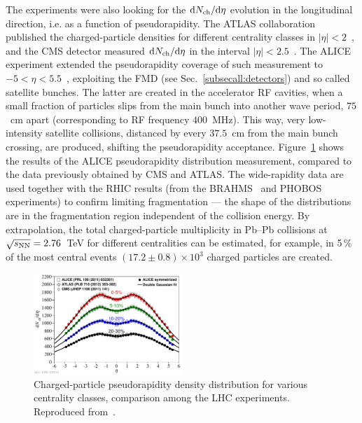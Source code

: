 The experiments were also looking for the ${\rm d}N_{\rm ch}/{\rm d}\eta$ evolution in the longitudinal direction, i.e. as a function of pseudorapidity. The ATLAS collaboration published the charged-particle densities for different centrality classes in $|\eta| < 2$~\cite{ATLAS:2011ag}, and the CMS detector measured ${\rm d}N_{\rm ch}/{\rm d}\eta$ in the interval $|\eta| < 2.5$~\cite{Chatrchyan:2011pb}. The ALICE experiment extended the pseudorapidity coverage of such measurement to $- 5 < \eta < 5.5$~\cite{Abbas:2013bpa}, exploiting the FMD (see Sec.~\ref{subsecall:detectors}) and so called satellite bunches. The latter are created in the accelerator RF cavities, when a small fraction of particles slips from the main bunch into another wave period, $75$~cm apart (corresponding to RF frequency $400$~MHz). This way, very low-intensity satellite collisions, distanced by every $37.5$~cm from the main bunch crossing, are produced, shifting the pseudorapidity acceptance. Figure~\ref{figks:MultEta} shows the results of the ALICE pseudorapidity distribution measurement, compared to the data previously obtained by CMS and ATLAS. The wide-rapidity data are used together with the RHIC results (from the BRAHMS~\cite{Bearden:2001qq} and PHOBOS~\cite{Alver:2010ck} experiments) to confirm limiting fragmentation --- the shape of the distributions are in the fragmentation region independent of the collision energy. By extrapolation, the total charged-particle multiplicity in Pb--Pb collisions at $\sqrt{s_{\rm NN}} = 2.76$~TeV for different centralities can be estimated, for example, in 5\,\% of the most central events $(17.2 \pm 0.8) \times 10^3$ charged particles are created.

\begin{figure}
\centering
\includegraphics[width=0.5\textwidth]{ksfigures/MultEtaCent.pdf}
\caption{Charged-particle pseudorapidity density distribution for various centrality classes, comparison among the LHC experiments. Reproduced from~\cite{Abbas:2013bpa}.}
\label{figks:MultEta}
\end{figure}


